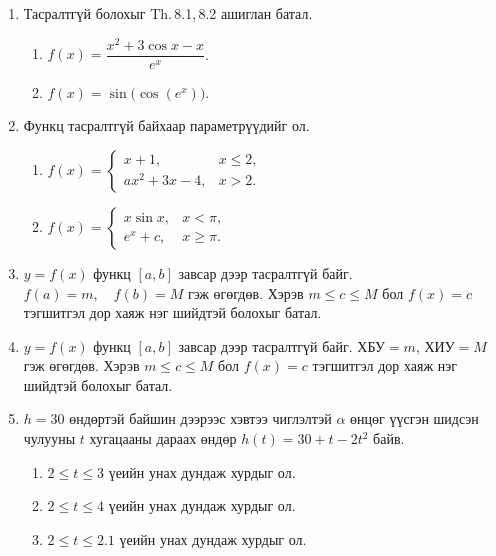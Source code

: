 \begin{enumerate}
\begin{center}
\end{center}

(a) $x=-2$, \quad (b) $x=-1$, \quad (c) $x=0$, \quad (d) $x=1$, \quad (e) $x=2$, \quad (f) $x=3$.
\item Тасралтгүй болохыг Th.\,8.1,\,8.2 ашиглан батал.
\begin{enumerate}[label=\alph*)]
  \item $f(x)=\dfrac{x^{2}+3\cos x - x}{e^{x}}$.
  \item $f(x)=\sin\!\big(\cos(e^{x})\big)$.
\end{enumerate}
\item Функц тасралтгүй байхаар параметрүүдийг ол.
\begin{enumerate}[label=\alph*)]
  \item $f(x)=
  \begin{cases}
    x+1, & x\le 2,\\
    a x^{2}+3x-4, & x>2.
  \end{cases}$
  \item $f(x)=
  \begin{cases}
    x\sin x, & x<\pi,\\
    e^{x}+c, & x\ge \pi.
  \end{cases}$
\end{enumerate}
\item $y=f(x)$ функц $[a,b]$ завсар дээр тасралтгүй байг.  
$f(a)=m,\quad f(b)=M$ гэж өгөгдөв.  
Хэрэв $m \le c \le M$ бол $f(x)=c$ тэгшитгэл дор хаяж нэг шийдтэй болохыг батал.
\item $y=f(x)$ функц $[a,b]$ завсар дээр тасралтгүй байг.  
ХБУ$=m$,  ХИУ$=M$ гэж өгөгдөв.  
Хэрэв $m \le c \le M$ бол $f(x)=c$ тэгшитгэл дор хаяж нэг шийдтэй болохыг батал.
\item $h=30$ өндөртэй байшин дээрээс хэвтээ чиглэлтэй $\alpha$ өнцөг үүсгэн шидсэн чулууны $t$ хугацааны дараах өндөр $h(t)=30+t-2t^2$ байв.
\begin{enumerate}[label=(\alph*)]
  \item $2\leq t\leq 3$ үеийн унах дундаж хурдыг ол. 
    \item $2\leq t\leq 4$ үеийн унах дундаж хурдыг ол.
    \item $2\leq t\leq 2.1$ үеийн унах дундаж хурдыг ол.

\end{enumerate}
\end{enumerate}
